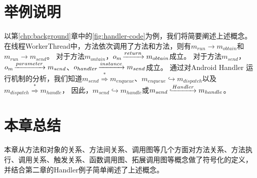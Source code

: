 \section{举例说明}



以第\ref{chp:background}章中的\autoref{fig:handler-code}为例，我们将简要阐述上述概念。
在线程WorkerThread中，方法依次调用了方法和方法，则有$m_{run} \to m_{obtain} $和$m_{run} \to m_{send}$。
对于方法$m_{ontain}$，$o_{m} \joinrel\xrightarrow{return} m_{obtain} $成立。
对于方法$m_{send}$，$o_{m} \joinrel\xrightarrow{parameter} m_{send} $、$o_{handler} \joinrel\xrightarrow{instance} m_{send} $成立。
通过对Android Handler 运行机制的分析，我们知道$m_{send} \stackrel{\ast	}{\Rightarrow} m_{enqueue} $、$m_{enqueue} \hookrightarrow m_{dispatch}$以及$m_{dispatch} \stackrel{\ast}{\Rightarrow}  m_{handle}$，
因此，$m_{send} \hookrightarrow m_{handle}$或$m_{send} \lhook\joinrel\xrightarrow{Handler}  m_{handle} $。


\section{本章总结}

本章从方法和对象的关系、方法间关系、调用图等几个方面对方法关系、方法执行、调用关系、触发关系、函数调用图、拓展调用图等概念做了符号化的定义，
并结合第二章的Handler例子简单阐述了上述概念。
